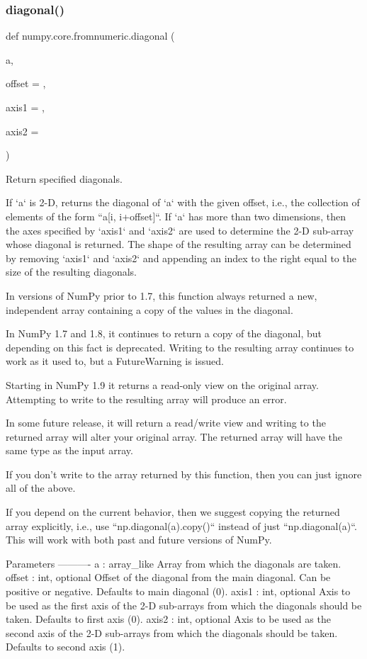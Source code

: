 \subsubsection{\texorpdfstring{diagonal()}{diagonal()}}
{\footnotesize\ttfamily def numpy.\+core.\+fromnumeric.\+diagonal (\begin{DoxyParamCaption}\item[{}]{a,  }\item[{}]{offset = {},  }\item[{}]{axis1 = {},  }\item[{}]{axis2 = {} }\end{DoxyParamCaption})}

\begin{DoxyVerb}Return specified diagonals.

If `a` is 2-D, returns the diagonal of `a` with the given offset,
i.e., the collection of elements of the form ``a[i, i+offset]``.  If
`a` has more than two dimensions, then the axes specified by `axis1`
and `axis2` are used to determine the 2-D sub-array whose diagonal is
returned.  The shape of the resulting array can be determined by
removing `axis1` and `axis2` and appending an index to the right equal
to the size of the resulting diagonals.

In versions of NumPy prior to 1.7, this function always returned a new,
independent array containing a copy of the values in the diagonal.

In NumPy 1.7 and 1.8, it continues to return a copy of the diagonal,
but depending on this fact is deprecated. Writing to the resulting
array continues to work as it used to, but a FutureWarning is issued.

Starting in NumPy 1.9 it returns a read-only view on the original array.
Attempting to write to the resulting array will produce an error.

In some future release, it will return a read/write view and writing to
the returned array will alter your original array.  The returned array
will have the same type as the input array.

If you don't write to the array returned by this function, then you can
just ignore all of the above.

If you depend on the current behavior, then we suggest copying the
returned array explicitly, i.e., use ``np.diagonal(a).copy()`` instead
of just ``np.diagonal(a)``. This will work with both past and future
versions of NumPy.

Parameters
----------
a : array_like
    Array from which the diagonals are taken.
offset : int, optional
    Offset of the diagonal from the main diagonal.  Can be positive or
    negative.  Defaults to main diagonal (0).
axis1 : int, optional
    Axis to be used as the first axis of the 2-D sub-arrays from which
    the diagonals should be taken.  Defaults to first axis (0).
axis2 : int, optional
    Axis to be used as the second axis of the 2-D sub-arrays from
    which the diagonals should be taken. Defaults to second axis (1).


\end{DoxyVerb}
